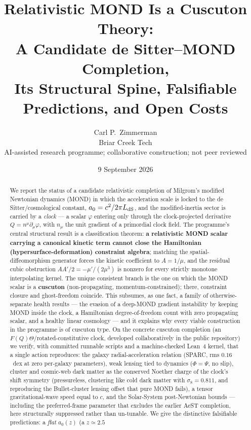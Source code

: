 \documentclass[11pt,letterpaper]{article}
\title{Relativistic MOND Is a Cuscuton Theory:\\ A Candidate de Sitter--MOND Completion,\\ Its Structural Spine, Falsifiable Predictions, and Open Costs}
\author{Carl P.\ Zimmerman\\ \small Briar Creek Tech\\ \small AI-assisted research programme; collaborative construction; not peer reviewed}
\date{9 September 2026}
\begin{document}
\maketitle

\begin{abstract}
We report the status of a candidate relativistic completion of Milgrom's modified Newtonian dynamics (MOND)
in which the acceleration scale is locked to the de Sitter/cosmological constant, $a_0=c^2/2\pi L_{\rm dS}$,
and the modified-inertia sector is carried by a \emph{clock} --- a scalar $\varphi$ entering only through the
clock-projected derivative $Q=n^\mu\partial_\mu\varphi$, with $n_\mu$ the unit gradient of a primordial clock
field. The programme's central structural result is a classification theorem: \textbf{a relativistic MOND
scalar carrying a canonical kinetic term cannot close the Hamiltonian (hypersurface-deformation) constraint
algebra}; matching the spatial-diffeomorphism generator forces the kinetic coefficient to $A=1/\mu$, and the
residual cubic obstruction $AA'/2=-\mu'/(2\mu^3)$ is nonzero for every strictly monotone interpolating kernel.
The unique consistent branch is the one on which the MOND scalar is a \textbf{cuscuton} (non-propagating,
momentum-constrained); there, constraint closure and ghost-freedom coincide. This subsumes, as one fact, a
family of otherwise-separate health results --- the evasion of a deep-MOND gradient instability by keeping
MOND inside the clock, a Hamiltonian degree-of-freedom count with zero propagating scalar, and a healthy
linear cosmology --- and it explains why every viable construction in the programme is of cuscuton type.
On the concrete cuscuton completion (an $F(Q)\Theta$/rotated-constitutive clock, developed collaboratively in
the public repository) we verify, with committed runnable scripts and a machine-checked Lean~4 kernel, that a
single action reproduces: the galaxy radial-acceleration relation (SPARC, rms $0.16$~dex at zero per-galaxy
parameters), weak lensing tied to dynamics ($\Phi=\Psi$, no slip), cluster and cosmic-web dark matter as the
conserved Noether charge of the clock's shift symmetry (pressureless, clustering like cold dark matter with
$\sigma_8=0.811$, and reproducing the Bullet-cluster lensing offset that pure MOND fails), a tensor
gravitational-wave speed equal to $c$, and the Solar-System post-Newtonian bounds --- including the
preferred-frame parameter that excludes the earlier AeST completion, here structurally suppressed rather than
un-tunable. We give the distinctive falsifiable predictions: a \emph{flat} $a_0(z)$ (a $z\simeq2.5$

\end{abstract}
\end{document}
